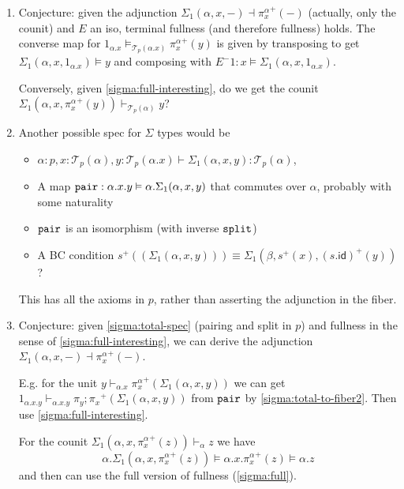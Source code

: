 \documentclass[10pt]{article}
\theoremstyle{definition}
\newcommand{\id}{\mathsf{id}}
\newcommand\TrPlus[2]{\ensuremath{{#1}^+(#2)}}
\newcommand\El[2]{\mathcal{T}_{#1}(#2)}
\begin{document}
\begin{enumerate}
\item Conjecture: given the adjunction $\Sigma_1(\alpha,x,-) \dashv
  \TrPlus{\pi^\alpha_x}{-}$ (actually, only the counit) and $E$ an iso,
  terminal fullness (and therefore fullness) holds.  The converse map
  for $1_{\alpha.x} \vDash_{\El{p}{\alpha.x}} \TrPlus{\pi^\alpha_x}{y}$
  is given by transposing to get $\Sigma_1(\alpha,x,1_{\alpha.x}) \vDash
  y$ and composing with $E^-1 : x \vDash
  \Sigma_1(\alpha,x,1_{\alpha.x})$.

  Conversely, given \ref{sigma:full-interesting}, do we get the counit
  $\Sigma_1(\alpha,x,\TrPlus{\pi^\alpha_x}{y}) \vdash_{\El{p}{\alpha}} y$?

\item \label{sigma:total-spec} Another possible spec for $\Sigma$ types
  would be
  \begin{itemize}
  \item $\alpha : p, x : \El{p}{\alpha}, y : \El{p}{\alpha.x} \vdash \Sigma_1(\alpha,x,y) : \El{p}{\alpha}$,
  \item A map $\mathtt{pair} : \alpha.x.y \vDash
    \alpha.\Sigma_1(\alpha,x,y)$ that commutes over $\alpha$, probably
    with some naturality
  \item $\mathtt{pair}$ is an isomorphism (with inverse $\mathtt{split}$)
  \item A BC condition $\TrPlus{s}{(\Sigma_1(\alpha,x,y))} \equiv
    \Sigma_1(\beta,\TrPlus{s}{x}, \TrPlus{(s . \id)}{y})$?
  \end{itemize}

  This has all the axioms in $p$, rather than asserting the adjunction
  in the fiber.

\item Conjecture: given \ref{sigma:total-spec} (pairing and split in
  $p$) and fullness in the sense of \ref{sigma:full-interesting}, we
  can derive the adjunction $\Sigma_1(\alpha,x,-) \dashv
  \TrPlus{\pi^\alpha_x}{-}$.

  E.g. for the unit $y \vdash_{\alpha.x} \TrPlus{\pi^\alpha_x}{\Sigma_1(\alpha,x,y)}$
  we can get
  $1_{\alpha.x.y} \vdash_{\alpha.x.y} \TrPlus{\pi_y;\pi_x}{\Sigma_1(\alpha,x,y)}$
  from $\mathtt{pair}$ by \ref{sigma:total-to-fiber2}.
  Then use \ref{sigma:full-interesting}.  

  For the counit
  $\Sigma_1(\alpha,x,\TrPlus{\pi^\alpha_x}{z}) \vdash_{\alpha} z$
  we have
  \[
  \alpha.\Sigma_1(\alpha,x,\TrPlus{\pi^\alpha_x}{z}) \vDash \alpha.x.\TrPlus{\pi^\alpha_x}{z} \vDash \alpha.z 
  \]
  and then can use the full version of fullness (\ref{sigma:full}).    


\end{enumerate}
\end{document}
